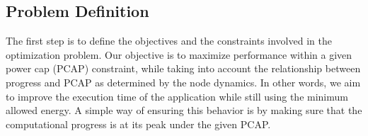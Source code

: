 
\subsection{Problem Definition}\label{subsec:Problem_statement}  
The first step is to define the objectives and the constraints involved in the optimization problem.
Our objective is to maximize performance within a given power cap (PCAP) constraint, while taking into account the relationship between progress and PCAP as determined by the node dynamics.
In other words, we aim to improve the execution time of the application while still using the minimum  allowed energy. A simple way of ensuring this behavior is by making sure that the computational progress is at its peak under the given PCAP.
